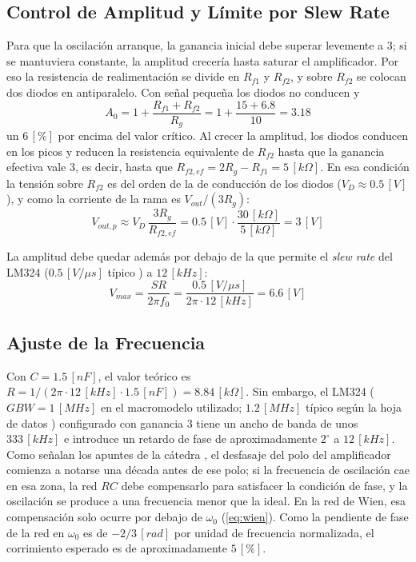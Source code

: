 \subsection{Control de Amplitud y Límite por Slew Rate}
\label{sec_5.2}
Para que la oscilación arranque, la ganancia inicial debe superar levemente a $3$; si se mantuviera constante, la amplitud crecería hasta saturar el amplificador. Por eso la resistencia de realimentación se divide en $R_{f1}$ y $R_{f2}$, y sobre $R_{f2}$ se colocan dos diodos en antiparalelo. Con señal pequeña los diodos no conducen y
\begin{equation}
    A_0 = 1 + \frac{R_{f1} + R_{f2}}{R_g} = 1 + \frac{15 + 6.8}{10} = 3.18
\end{equation}
un $6 \, [\%]$ por encima del valor crítico. Al crecer la amplitud, los diodos conducen en los picos y reducen la resistencia equivalente de $R_{f2}$ hasta que la ganancia efectiva vale $3$, es decir, hasta que $R_{f2,ef} = 2R_g - R_{f1} = 5 \, [k\Omega]$. En esa condición la tensión sobre $R_{f2}$ es del orden de la de conducción de los diodos ($V_D \approx 0.5 \, [V]$), y como la corriente de la rama es $V_{out}/(3R_g)$:
\begin{equation}
    V_{out,p} \approx V_D \, \frac{3 R_g}{R_{f2,ef}} = 0.5 \, [V] \cdot \frac{30 \, [k\Omega]}{5 \, [k\Omega]} = 3 \, [V]
    \label{eq:amplitud}
\end{equation}

La amplitud debe quedar además por debajo de la que permite el \textit{slew rate} del LM324 ($0.5 \, [V/\mu s]$ típico \cite[sec.~6.10]{lm324}) a $12 \, [kHz]$:
\begin{equation}
    V_{max} = \frac{SR}{2 \pi f_0} = \frac{0.5 \, [V/\mu s]}{2 \pi \cdot 12 \, [kHz]} = 6.6 \, [V]
\end{equation}

\subsection{Ajuste de la Frecuencia}
\label{sec_5.3}
Con $C = 1.5 \, [nF]$, el valor teórico es $R = 1/(2\pi \cdot 12 \, [kHz] \cdot 1.5 \, [nF]) = 8.84 \, [k\Omega]$. Sin embargo, el LM324 ($GBW = 1 \, [MHz]$ en el macromodelo utilizado; $1.2 \, [MHz]$ típico según la hoja de datos \cite[sec.~6.10]{lm324}) configurado con ganancia $3$ tiene un ancho de banda de unos $333 \, [kHz]$ e introduce un retardo de fase de aproximadamente $2^\circ$ a $12 \, [kHz]$. Como señalan los apuntes de la cátedra \cite[sec.~8.1]{apuntes8}, el desfasaje del polo del amplificador comienza a notarse una década antes de ese polo; si la frecuencia de oscilación cae en esa zona, la red $RC$ debe compensarlo para satisfacer la condición de fase, y la oscilación se produce a una frecuencia menor que la ideal. En la red de Wien, esa compensación solo ocurre por debajo de $\omega_0$ (\autoref{eq:wien}). Como la pendiente de fase de la red en $\omega_0$ es de $-2/3 \, [rad]$ por unidad de frecuencia normalizada, el corrimiento esperado es de aproximadamente $5 \, [\%]$.

